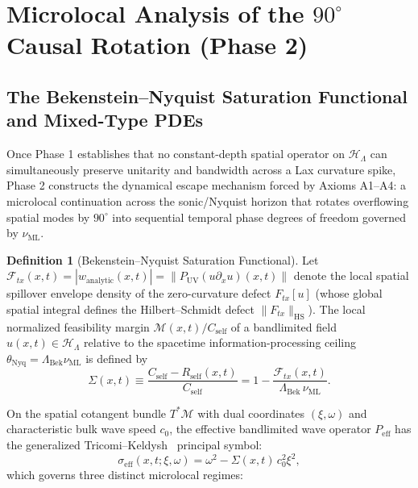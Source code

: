 \documentclass[11pt,a4paper]{article}
\theoremstyle{definition}
\newtheorem{definition}[theorem]{Definition}
\begin{document}
\section{Microlocal Analysis of the $90^\circ$ Causal Rotation (Phase 2)}
\label{sec:phase2}
\subsection{The Bekenstein--Nyquist Saturation Functional and Mixed-Type PDEs}
\label{subsec:phase2-saturation}
Once Phase 1 establishes that no constant-depth spatial operator on $\mathcal{H}_{\Lambda}$ can simultaneously preserve unitarity and bandwidth across a Lax curvature spike, Phase 2 constructs the dynamical escape mechanism forced by Axioms A1--A4: a microlocal continuation across the sonic/Nyquist horizon that rotates overflowing spatial modes by $90^\circ$ into sequential temporal phase degrees of freedom governed by $\nu_{\text{ML}}$.
\begin{definition}[Bekenstein--Nyquist Saturation Functional]
Let $\mathcal{F}_{tx}(x,t) = |w_{\text{analytic}}(x,t)| = \|P_{\text{UV}}(u\partial_x u)(x,t)\|$ denote the local spatial spillover envelope density of the zero-curvature defect $F_{tx}[u]$ (whose global spatial integral defines the Hilbert--Schmidt defect $\|F_{tx}\|_{\text{HS}}$). The local normalized feasibility margin $\mathcal{M}(x,t)/C_{\text{self}}$ of a bandlimited field $u(x,t) \in \mathcal{H}_{\Lambda}$ relative to the spacetime information-processing ceiling $\theta_{\text{Nyq}} = \Lambda_{\text{Bek}}\nu_{\text{ML}}$ is defined by
\begin{equation}
\Sigma(x, t) \equiv \frac{C_{\text{self}} - R_{\text{self}}(x,t)}{C_{\text{self}}} = 1 - \frac{\mathcal{F}_{tx}(x,t)}{\Lambda_{\text{Bek}} \, \nu_{\text{ML}}}.
\end{equation}
\end{definition}
On the spatial cotangent bundle $T^*\mathcal{M}$ with dual coordinates $(\xi, \omega)$ and characteristic bulk wave speed $c_0$, the effective bandlimited wave operator $P_{\text{eff}}$ has the generalized Tricomi--Keldysh~\cite{tricomi1923,keldysh1951} principal symbol:
\begin{equation}
\sigma_{\text{eff}}(x, t; \xi, \omega) = \omega^2 - \Sigma(x,t) \, c_0^2 \xi^2,
\end{equation}
which governs three distinct microlocal regimes:
\end{document}
